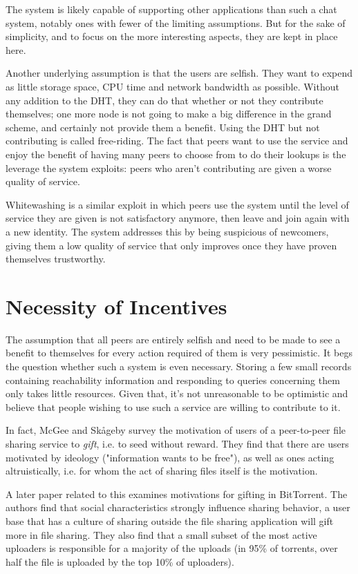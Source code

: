 The system is likely capable of supporting other applications than such a chat
system, notably ones with fewer of the limiting assumptions. But for the sake of
simplicity, and to focus on the more interesting aspects, they are kept in place
here.

Another underlying assumption is that the users are selfish. They want to expend
as little storage space, CPU time and network bandwidth as possible. Without any
addition to the \ac{DHT}, they can do that whether or not they contribute
themselves; one more node is not going to make a big difference in the grand
scheme, and certainly not provide them a benefit. Using the DHT but not
contributing is called free-riding. The fact that peers want to use the service
and enjoy the benefit of having many peers to choose from to do their lookups is
the leverage the system exploits: peers who aren't contributing are given a
worse quality of service.

Whitewashing is a similar exploit in which peers use the system until the level
of service they are given is not satisfactory anymore, then leave and join again
with a new identity. The system addresses this by being suspicious of newcomers,
giving them a low quality of service that only improves once they have proven
themselves trustworthy.

\section{Necessity of Incentives}
The assumption that all peers are entirely selfish and need to be made to see a
benefit to themselves for every action required of them is very pessimistic. It
begs the question whether such a system is even necessary. Storing a few small
records containing reachability information and responding to queries concerning
them only takes little resources. Given that, it's not unreasonable to be
optimistic and believe that people wishing to use such a service are willing to
contribute to it.

In fact, McGee and Sk{\aa}geby\cite{mcgee2004gifting} survey the motivation of
users of a peer-to-peer file sharing service to \emph{gift}, i.e. to seed
without reward. They find that there are users motivated by ideology
("information wants to be free"), as well as ones acting altruistically, i.e.
for whom the act of sharing files itself is the motivation.

A later paper\cite{ripeanu2006gifting} related to this examines motivations for
gifting in BitTorrent. The authors find that social characteristics strongly
influence sharing behavior, a user base that has a culture of sharing outside
the file sharing application will gift more in file sharing. They also find that
a small subset of the most active uploaders is responsible for a majority of the
uploads (in 95\% of torrents, over half the file is uploaded by the top 10\% of
uploaders).

